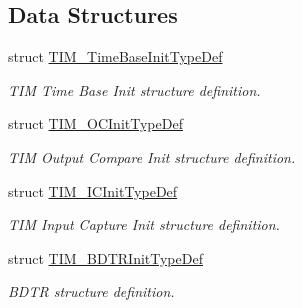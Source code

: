 \subsection*{Data Structures}
\begin{DoxyCompactItemize}
\item 
struct \hyperlink{struct_t_i_m___time_base_init_type_def}{T\+I\+M\+\_\+\+Time\+Base\+Init\+Type\+Def}
\begin{DoxyCompactList}\small\item\em T\+IM Time Base Init structure definition. \end{DoxyCompactList}\item 
struct \hyperlink{struct_t_i_m___o_c_init_type_def}{T\+I\+M\+\_\+\+O\+C\+Init\+Type\+Def}
\begin{DoxyCompactList}\small\item\em T\+IM Output Compare Init structure definition. \end{DoxyCompactList}\item 
struct \hyperlink{struct_t_i_m___i_c_init_type_def}{T\+I\+M\+\_\+\+I\+C\+Init\+Type\+Def}
\begin{DoxyCompactList}\small\item\em T\+IM Input Capture Init structure definition. \end{DoxyCompactList}\item 
struct \hyperlink{struct_t_i_m___b_d_t_r_init_type_def}{T\+I\+M\+\_\+\+B\+D\+T\+R\+Init\+Type\+Def}
\begin{DoxyCompactList}\small\item\em B\+D\+TR structure definition. \end{DoxyCompactList}\end{DoxyCompactItemize}
